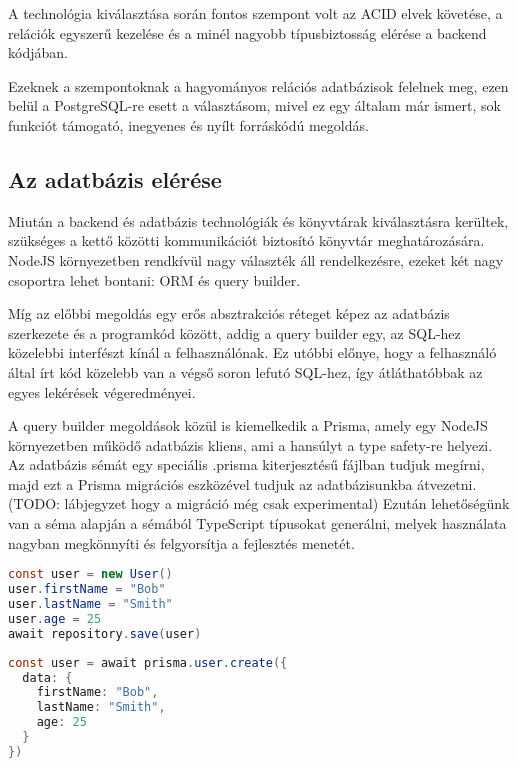 A technológia kiválasztása során fontos szempont volt az ACID elvek követése, a relációk egyszerű kezelése és a minél nagyobb típusbiztosság elérése a backend kódjában.

Ezeknek a szempontoknak a hagyományos relációs adatbázisok felelnek meg, ezen belül a PostgreSQL-re esett a választásom, mivel ez egy általam már ismert, sok funkciót támogató, inegyenes és nyílt forráskódú megoldás.

\subsection{Az adatbázis elérése}
Miután a backend és adatbázis technológiák és könyvtárak kiválasztásra kerültek, szükséges a kettő közötti kommunikációt biztosító könyvtár meghatározására.
NodeJS környezetben rendkívül nagy választék áll rendelkezésre, ezeket két nagy csoportra lehet bontani: ORM és query builder.

Míg az előbbi megoldás egy erős absztrakciós réteget képez az adatbázis szerkezete és a programkód között, addig a query builder egy, az SQL-hez közelebbi interfészt kínál a felhasználónak.
Ez utóbbi előnye, hogy a felhasználó által írt kód közelebb van a végső soron lefutó SQL-hez, így átláthatóbbak az egyes lekérések végeredményei.

A query builder megoldások közül is kiemelkedik a Prisma, amely egy NodeJS környezetben működő adatbázis kliens, ami a hansúlyt a type safety-re helyezi.
Az adatbázis sémát egy speciális .prisma kiterjesztésű fájlban tudjuk megírni, majd ezt a Prisma migrációs eszközével tudjuk az adatbázisunkba átvezetni. (TODO: lábjegyzet hogy a migráció még csak experimental)
Ezután lehetőségünk van a séma alapján a sémából TypeScript típusokat generálni, melyek használata nagyban megkönnyíti és felgyorsítja a fejlesztés menetét.

\begin{lstlisting}[language=Java, caption=Adatbázis beillesztés TypeORM környezetben]
const user = new User()
user.firstName = "Bob"
user.lastName = "Smith"
user.age = 25
await repository.save(user)
\end{lstlisting}

\begin{lstlisting}[language=Java, caption=Adatbázis beillesztés Prisma segítségével]
const user = await prisma.user.create({
  data: {
    firstName: "Bob",
    lastName: "Smith",
    age: 25
  }
})
\end{lstlisting}

